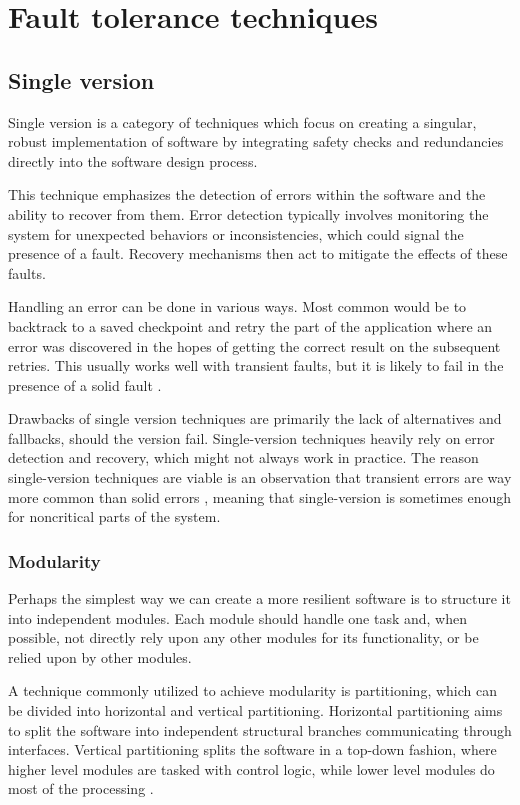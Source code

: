 \documentclass[12pt, letterpaper]{article}
\begin{document}
\section{Fault tolerance techniques}

\subsection{Single version} \label{single}

Single version is a category of techniques which focus on creating a singular, robust implementation of software by integrating safety checks and redundancies directly into the software design process.

This technique emphasizes the detection of errors within the software and the ability to recover from them. Error detection typically involves monitoring the system for unexpected behaviors or inconsistencies, which could signal the presence of a fault. Recovery mechanisms then act to mitigate the effects of these faults.

Handling an error can be done in various ways. Most common would be to backtrack to a saved checkpoint and retry the part of the application where an error was discovered in the hopes of getting the correct result on the subsequent retries. This usually works well with transient faults, but it is likely to fail in the presence of a solid fault \cite{1402092}. 

Drawbacks of single version techniques are primarily the lack of alternatives and fallbacks, should the version fail. Single-version techniques heavily rely on error detection and recovery, which might not always work in practice. The reason single-version techniques are viable is an observation that transient errors are way more common than solid errors \cite{1676899}, meaning that single-version is sometimes enough for noncritical parts of the system.

\subsubsection{Modularity}

Perhaps the simplest way we can create a more resilient software is to structure it into independent modules. Each module should handle one task and, when possible, not directly rely upon any other modules for its functionality, or be relied upon by other modules.

A technique commonly utilized to achieve modularity is partitioning, which can be divided into horizontal and vertical partitioning. Horizontal partitioning aims to split the software into independent structural branches communicating through interfaces. 
Vertical partitioning splits the software in a top-down fashion, where higher level modules are tasked with control logic, while lower level modules do most of the processing \cite{nasa:sft}.
\end{document}
